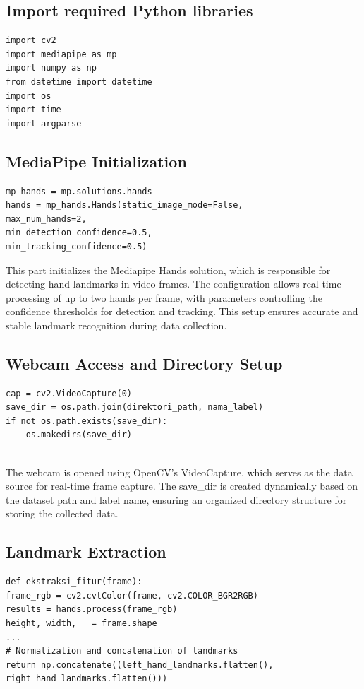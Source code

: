 \subsection{Import required Python libraries}
\begin{lstlisting}
import cv2
import mediapipe as mp
import numpy as np
from datetime import datetime
import os
import time
import argparse
\end{lstlisting}

\subsection{MediaPipe Initialization}
\begin{lstlisting}
mp_hands = mp.solutions.hands
hands = mp_hands.Hands(static_image_mode=False,
max_num_hands=2,
min_detection_confidence=0.5,
min_tracking_confidence=0.5)

\end{lstlisting}

This part initializes the Mediapipe Hands solution, which is responsible for detecting hand landmarks in video frames. The configuration allows real-time processing of up to two hands per frame, with parameters controlling the confidence thresholds for detection and tracking. This setup ensures accurate and stable landmark recognition during data collection.

\subsection{ Webcam Access and Directory Setup}

\begin{lstlisting}
cap = cv2.VideoCapture(0)
save_dir = os.path.join(direktori_path, nama_label)
if not os.path.exists(save_dir):
	os.makedirs(save_dir)
	
\end{lstlisting}

The webcam is opened using OpenCV’s VideoCapture, which serves as the data source for real-time frame capture. The save\_dir is created dynamically based on the dataset path and label name, ensuring an organized directory structure for storing the collected data.

\subsection{Landmark Extraction}
\begin{lstlisting}
def ekstraksi_fitur(frame):
frame_rgb = cv2.cvtColor(frame, cv2.COLOR_BGR2RGB)
results = hands.process(frame_rgb)
height, width, _ = frame.shape
...
# Normalization and concatenation of landmarks
return np.concatenate((left_hand_landmarks.flatten(), right_hand_landmarks.flatten()))

\end{lstlisting}

